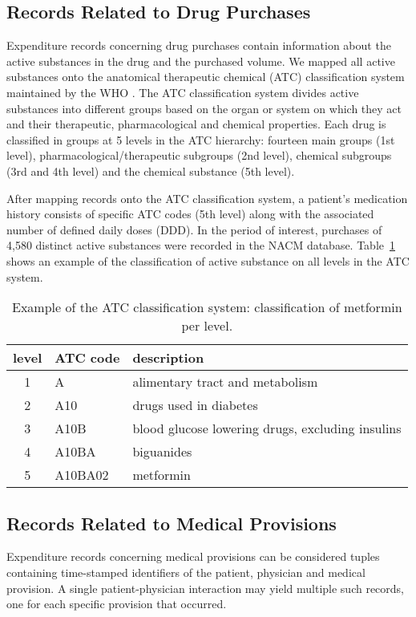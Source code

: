 \subsection{Records Related to Drug Purchases}
Expenditure records concerning drug purchases contain information about the active substances in the drug and the purchased volume. We mapped all active substances onto the anatomical therapeutic chemical (ATC) classification system maintained by the WHO \citep{world1996guidelines}. The ATC classification system divides active substances into different groups based on the organ or system on which they act and their therapeutic, pharmacological and chemical properties. Each drug is classified in groups at 5 levels in the ATC hierarchy: fourteen main groups (1st level), pharmacological/therapeutic subgroups (2nd level), chemical subgroups (3rd and 4th level) and the chemical substance (5th level).

After mapping records onto the ATC classification system, a patient's medication history consists of specific ATC codes (5th level) along with the associated number of defined daily doses (DDD). In the period of interest, purchases of 4,580 distinct active substances were recorded in the NACM database. Table~\ref{table:atc-example} shows an example of the classification of active substance on all levels in the ATC system.

\begin{table}[!h]
\centering
\begin{tabular}{cll}
\toprule
level	 & ATC code	 & description \\
\midrule
1 	& A	& alimentary tract and metabolism \\
2	& A10	& drugs used in diabetes \\
3	& A10B	& blood glucose lowering drugs, excluding insulins \\
4	& A10BA & biguanides \\
5	& A10BA02 & metformin \\
\bottomrule
\end{tabular}
\caption{Example of the ATC classification system: classification of metformin per level.}
\label{table:atc-example}
\end{table}

\subsection{Records Related to Medical Provisions}
Expenditure records concerning medical provisions can be considered tuples containing time-stamped identifiers of the patient, physician and medical provision. A single patient-physician interaction may yield multiple such records, one for each specific provision that occurred.

